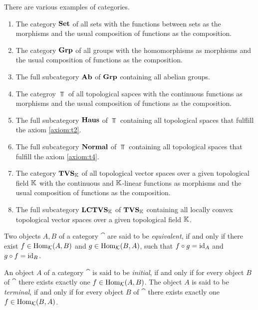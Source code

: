 \begin{example}
	There are various examples of categories. 
	\begin{enumerate}
		\item The category $\mathbf{Set}$ of all sets with the functions between sets as the morphisms and the usual composition of functions as the composition.
		
		\item The category $\mathbf{Grp}$ of all groups with the homomorphisms as morphisms and the usual composition of functions as the composition.
		
		\item The full subcategory $\mathbf{Ab}$ of $\mathbf{Grp}$ containing all abelian groups. 
		
		\item The categroy $\Top$ of all topological sapces with the continuous functions as morphisms and the usual composition of functions as the composition.
		
		\item The full subcategory $\mathbf{Haus}$ of $\Top$ containing all topological spaces that fulflill the axiom \ref{axiom:t2}. 
		
		\item The full subcategory $\mathbf{Normal}$ of $\Top$ containing all topological spaces that fulfill the axiom \ref{axiom:t4}. 
		
		\item The category $\mathbf{TVS}_{\mathbb K}$ of all topological vector spaces over a given topological field $\mathbb K$ with the continuous and $\mathbb K$-linear functions as morphisms and the usual composition of functions as the composition.
		
		\item The full subcategory $\mathbf{LCTVS}_{\mathbb K}$ of $\mathbf{TVS}_{\mathbb K}$ containing all locally convex topological vector spaces over a given topological field $\mathbb K$.
	\end{enumerate}
\end{example}

\begin{definition}
	Two objects $A, B$ of a category $\cat$ are said to be \textit{equivalent}, if and only if there exist $f \in \operatorname{Hom}_\mathcal K(A,B)$ and $g \in \operatorname{Hom}_\mathcal K(B,A)$, such that $f \circ g = \operatorname{id}_A$ and $g \circ f = \operatorname{id}_B$. 
\end{definition}

\begin{definition}
	An object $A$ of a category $\cat$ is said to be \textit{initial}, if and only if for every object $B$ of $\cat$ there exists exactly one $f \in \operatorname{Hom}_\mathcal K(A, B)$. The object $A$ is said to be \textit{terminal}, if and only if for every object $B$ of $\cat$ there exists exactly one $f \in \operatorname{Hom}_\mathcal K(B, A)$.   
\end{definition}

